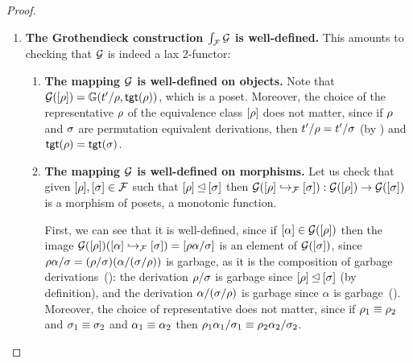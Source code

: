 \begin{proof}
\begin{enumerate}
\item {\bf The Grothendieck construction $\int_{\mathcal{F}}{\mathcal{G}}$ is well-defined.}
  This amounts to checking that $\mathcal{G}$ is indeed a lax 2-functor:
  \begin{enumerate}
  \item {\bf The mapping $\mathcal{G}$ is well-defined on objects.}
    Note that $\mathcal{G}({[\rho]}) = \mathbb{G}(t'/\rho, \mathsf{tgt}(\rho))$, which is a poset.
    Moreover, the choice of the representative $\rho$ of the equivalence class ${[\rho]}$
    does not matter,
    since if $\rho$ and $\sigma$ are permutation equivalent derivations,
    then $t'/\rho = t'/\sigma$ (by )
    and $\mathsf{tgt}(\rho) = \mathsf{tgt}(\sigma)$.
  \item {\bf The mapping $\mathcal{G}$ is well-defined on morphisms.}
    Let us check that given ${[\rho]},{[\sigma]} \in \mathcal{F}$
    such that ${[\rho]} \unlhd {[\sigma]}$
    then
    $
      \mathcal{G}({[\rho]} \hookrightarrow_{\mathcal{F}} {[\sigma]}) : \mathcal{G}({[\rho]}) \to \mathcal{G}({[\sigma]})
    $ is a morphism of posets, \ie a monotonic function.

    First, we can see that it is well-defined,
    since if ${[\alpha]} \in \mathcal{G}([\rho])$
    then the image $\mathcal{G}({[\rho]})({[\alpha]} \hookrightarrow_{\mathcal{F}} {[\sigma]}) = {[\rho\alpha/\sigma]}$
    is an element of $\mathcal{G}([\sigma])$,
    since
    $
      \rho\alpha/\sigma = (\rho/\sigma)(\alpha/(\sigma/\rho))
    $
    is garbage, as it is the composition of garbage derivations~():
    the derivation $\rho/\sigma$ is garbage since ${[\rho]} \unlhd {[\sigma]}$ (by definition),
    and the derivation $\alpha/(\sigma/\rho)$ is garbage since $\alpha$ is garbage~().
    Moreover, the choice of representative does not matter,
    since if $\rho_1 \equiv \rho_2$ and $\sigma_1 \equiv \sigma_2$ and $\alpha_1 \equiv \alpha_2$
    then $\rho_1\alpha_1/\sigma_1 \equiv \rho_2\alpha_2/\sigma_2$.


\end{enumerate}
\end{enumerate}
\end{proof}
